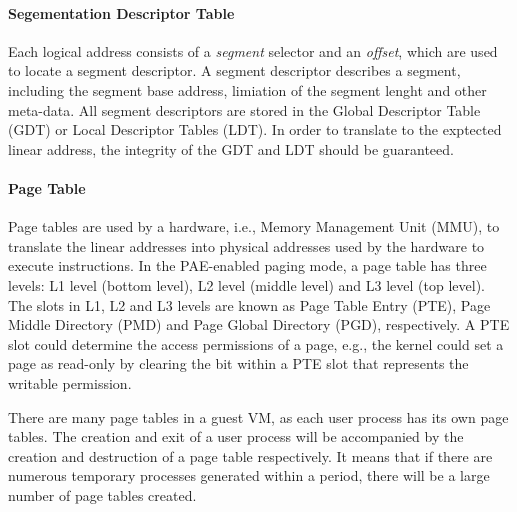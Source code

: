 \paragraph{Segementation Descriptor Table}\label{sec:gdt}
Each logical address consists of a \emph{segment} selector and an \emph{offset}, which are used to locate a segment descriptor.
A segment descriptor describes a segment, including the segment base address, limiation of the segment lenght and other meta-data.
All segment descriptors are stored in the Global Descriptor Table (GDT) or Local Descriptor Tables (LDT).
In order to translate to the exptected linear address, the integrity of the GDT and LDT should be guaranteed.

\paragraph{Page Table}\label{sec:pagetable}
Page tables are used by a hardware, i.e., Memory Management Unit (MMU), to translate the linear addresses into physical addresses used by the hardware to execute instructions.
In the PAE-enabled paging mode, a page table has three levels: L1 level (bottom level), L2 level (middle level) and L3 level (top level).
The slots in L1, L2 and L3 levels are known as Page Table Entry (PTE), Page Middle Directory (PMD) and Page Global Directory (PGD), respectively.
A PTE slot could determine the access permissions of a page, e.g., the kernel could set a page as read-only by clearing the bit within a PTE slot that represents the writable permission.

There are many page tables in a guest VM, as each user process has its own page tables.
The creation and exit of a user process will be accompanied by the creation and destruction of a page table respectively.
It means that if there are numerous temporary processes generated within a period, there will be a large number of page tables created.

